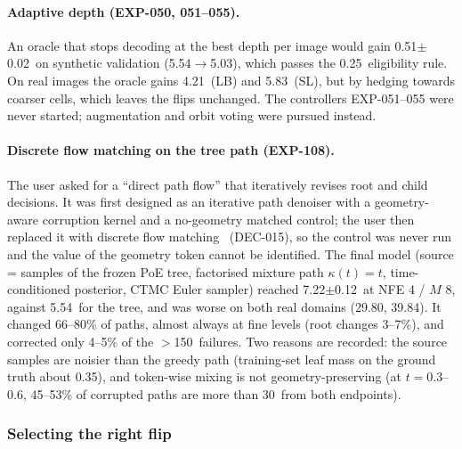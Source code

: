 \paragraph{Adaptive depth (EXP-050, 051--055).}
An oracle that stops decoding at the best depth per image would gain 0.51$\pm$0.02\appDdeg\ on synthetic validation (5.54\appDdeg$\to$5.03\appDdeg), which passes the 0.25\appDdeg\ eligibility rule. On real images the oracle gains 4.21\appDdeg\ (LB) and 5.83\appDdeg\ (SL), but by hedging towards coarser cells, which leaves the flips unchanged. The controllers EXP-051--055 were never started; augmentation and orbit voting were pursued instead.

\paragraph{Discrete flow matching on the tree path (EXP-108).}
The user asked for a ``direct path flow'' that iteratively revises root and child decisions. It was first designed as an iterative path denoiser with a geometry-aware corruption kernel and a no-geometry matched control; the user then replaced it with discrete flow matching~\cite{gat2024dfm} (DEC-015), so the control was never run and the value of the geometry token cannot be identified. The final model (source = samples of the frozen PoE tree, factorised mixture path $\kappa(t)=t$, time-conditioned posterior, CTMC Euler sampler) reached 7.22$\pm$0.12\appDdeg\ at NFE 4 / $M$ 8, against 5.54\appDdeg\ for the tree, and was worse on both real domains (29.80\appDdeg, 39.84\appDdeg). It changed 66--80\% of paths, almost always at fine levels (root changes 3--7\%), and corrected only 4--5\% of the $>$150\appDdeg\ failures. Two reasons are recorded: the source samples are noisier than the greedy path (training-set leaf mass on the ground truth about 0.35), and token-wise mixing is not geometry-preserving (at $t=0.3$--0.6, 45--53\% of corrupted paths are more than 30\appDdeg\ from both endpoints).

\subsubsection{Selecting the right flip}\label{app:log_neg_flip}

